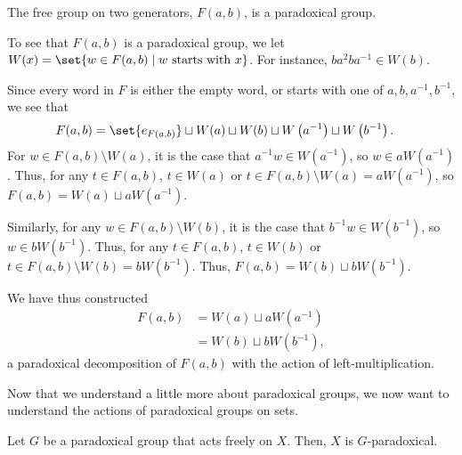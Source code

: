 \begin{example}
  The free group on two generators, $F(a,b)$, is a paradoxical group.\newline

  To see that $F(a,b)$ is a paradoxical group, we let $W(x) = \set{w\in F(a,b)\mid w\text{ starts with }x}$. For instance, $ba^2ba^{-1}\in W(b)$.\newline

  Since every word in $F$ is either the empty word, or starts with one of $a,b,a^{-1},b^{-1}$, we see that
  \begin{align*}
    F(a,b) &= \set{e_{F(a,b)}} \sqcup W(a) \sqcup W(b) \sqcup W\left(a^{-1}\right) \sqcup W\left(b^{-1}\right).
  \end{align*}
  For $w\in F(a,b)\setminus W(a)$, it is the case that $a^{-1}w\in W\left(a^{-1}\right)$, so $w\in aW\left(a^{-1}\right)$. Thus, for any $t\in F(a,b)$, $t\in W(a)$ or $t\in F(a,b)\setminus W(a) = aW\left(a^{-1}\right)$, so $F(a,b) = W(a)\sqcup aW\left(a^{-1}\right)$.\newline

  Similarly, for any $w\in F(a,b)\setminus W(b)$, it is the case that $b^{-1}w\in W\left(b^{-1}\right)$, so $w\in bW\left(b^{-1}\right)$. Thus, for any $t\in F(a,b)$, $t\in W(b)$ or $t\in F(a,b) \setminus W(b) = bW\left(b^{-1}\right)$. Thus, $F(a,b) = W(b)\sqcup bW\left(b^{-1}\right)$.\newline

  We have thus constructed
  \begin{align*}
    F(a,b) &= W(a)\sqcup aW\left(a^{-1}\right)\\
           &= W(b)\sqcup bW\left(b^{-1}\right),
  \end{align*}
  a paradoxical decomposition of $F(a,b)$ with the action of left-multiplication.
\end{example}
Now that we understand a little more about paradoxical groups, we now want to understand the actions of paradoxical groups on sets.
\begin{proposition}
  Let $G$ be a paradoxical group that acts freely on $X$. Then, $X$ is $G$-paradoxical.
\end{proposition}

